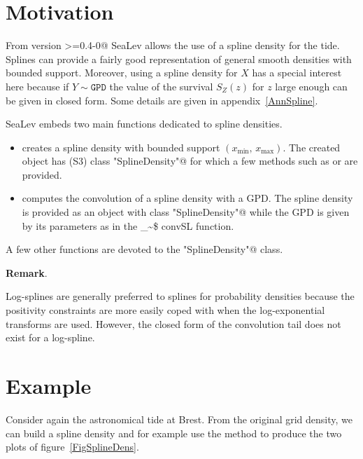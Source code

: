 \documentclass[11pt,a4paper]{report}\usepackage[]{graphicx}\usepackage[]{color}
\makeatletter
\newcommand\code{\bgroup\@makeother\_\@makeother\~\@makeother\$\@codex}
\def\@codex#1{{\normalfont\ttfamily\hyphenchar\font=-1 #1}\egroup}
\newcommand{\pkg}[1]{{\fontseries{b}\selectfont #1}}
\newcommand{\Low}[1]{#1_{\mathrm{min}}}
\newcommand{\Up}[1]{#1_{\mathrm{max}}}
\newenvironment{remark}
   {\medskip \par \noindent%
    \small\textbf{Remark}.%
   }%
   {\par \noindent}
\makeatother
\begin{document}

\section{Motivation}
From version \verb@>=0.4-0@ \pkg{SeaLev} allows the use of a spline
density for the tide. Splines can provide a fairly good representation
of general smooth densities with bounded support. Moreover, using a
spline density for $X$ has a special interest here because if $Y \sim
\texttt{GPD}$ the value of the survival $S_Z(z)$ for $z$ large enough
can be given in closed form. Some details are given in
appendix~\ref{AnnSpline}.

\pkg{SeaLev} embeds two main functions dedicated to spline densities.
\begin{itemize}
  
\item \verb@SplineDensity@ creates a spline density with bounded support
  $(\Low{x},\,\Up{x})$. The created object has (S3) class \verb@"SplineDensity"@
  for which a few methods such as \verb@plot@ or \verb@predict@ are provided.
  
  
\item \verb@GPtail@ computes the convolution of a spline density with a 
  GPD. The spline density is provided as an object with class
  \verb@"SplineDensity"@ while the GPD is given by its parameters as 
  in the \code{convSL} function.

\end{itemize}
A few other functions are devoted to the \verb@"SplineDensity"@ class. 

\begin{remark}
  Log-splines are generally preferred to splines for probability densities
  because the positivity constraints are more easily coped with when the
  log-exponential transforms are used. However, the closed form of the
  convolution tail does not exist for a log-spline.
\end{remark}


\section{Example}
Consider again the astronomical tide at Brest. From the original
grid density, we can build a spline density and for example use the 
\verb@plot@ method to produce the two plots of figure~\ref{FigSplineDens}.
 
\end{document}
